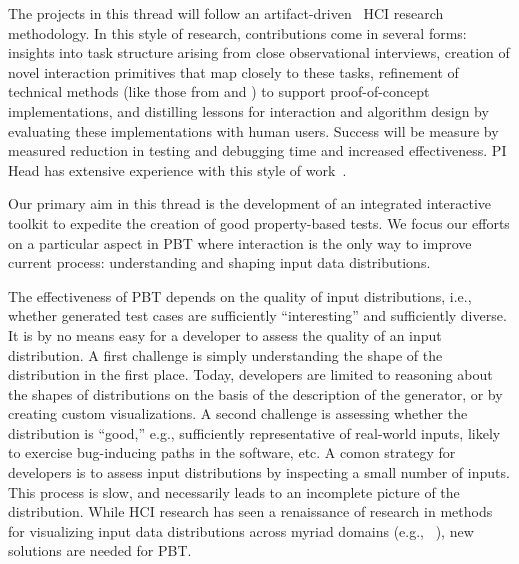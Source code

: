 The projects in this thread
 will follow an
artifact-driven~\cite{ref:wobbrock2016research} HCI research methodology.
In this style of research, contributions come in several forms: insights into task
structure arising from close observational interviews, creation of novel
interaction primitives that map closely to these tasks, refinement of
technical methods (like those from  and
) to support proof-of-concept implementations,
and distilling
lessons for interaction and algorithm design by evaluating these
implementations
with human users. Success will be measure by measured
reduction in
testing and debugging time and increased effectiveness.
PI Head has extensive experience with this style of work~\cite{ref:head2015tutorons,ref:suzuki2017tracediff,ref:head2017writing,ref:head2018when,ref:head2018interactive,ref:head2019managing,ref:head2020composing}.

%
Our primary aim in this thread is the development of an integrated interactive toolkit to expedite the creation of good property-based tests. We focus our efforts on a particular aspect in PBT where interaction is the only way to improve current process: understanding and shaping input data distributions.

The effectiveness of PBT depends on the quality of input distributions, i.e., whether generated test cases are sufficiently ``interesting'' and sufficiently diverse.
It is by no means easy for a developer to assess the quality of
an input distribution. A first challenge is simply understanding the shape of the distribution in the first place. Today, developers are limited to reasoning about the shapes of distributions on the basis of the description of the generator, or by creating custom visualizations. A second challenge is assessing whether the distribution is ``good,'' e.g., sufficiently representative of real-world inputs, likely to exercise bug-inducing paths in the software, etc.
A comon strategy for developers is to assess input distributions by inspecting a
small number of inputs. This process is slow, and necessarily leads to an incomplete picture of the distribution.
While HCI research has seen a renaissance of research in methods for visualizing input data distributions across myriad domains (e.g.,
~\cite{ref:hohman2019gamut,ref:hohman2020understanding,ref:kang2017omnicode}), new solutions are needed for PBT.

